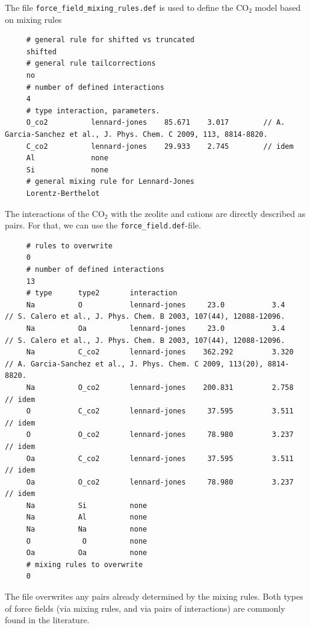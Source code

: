 \noindent 
The file \verb+force_field_mixing_rules.def+ is used to define the CO$_2$ model based on mixing rules
\begin{tiny}
\begin{verbatim}
     # general rule for shifted vs truncated
     shifted
     # general rule tailcorrections
     no
     # number of defined interactions
     4
     # type interaction, parameters.
     O_co2          lennard-jones    85.671    3.017        // A. Garcia-Sanchez et al., J. Phys. Chem. C 2009, 113, 8814-8820.
     C_co2          lennard-jones    29.933    2.745        // idem
     Al             none
     Si             none
     # general mixing rule for Lennard-Jones
     Lorentz-Berthelot
\end{verbatim}
\end{tiny}
The interactions of the CO$_2$ with the zeolite and cations are directly described as pairs.
For that, we can use the \verb+force_field.def+-file.
\begin{tiny}
\begin{verbatim}
     # rules to overwrite
     0
     # number of defined interactions
     13
     # type      type2       interaction
     Na          O           lennard-jones     23.0           3.4        // S. Calero et al., J. Phys. Chem. B 2003, 107(44), 12088-12096.
     Na          Oa          lennard-jones     23.0           3.4        // S. Calero et al., J. Phys. Chem. B 2003, 107(44), 12088-12096.
     Na          C_co2       lennard-jones    362.292         3.320      // A. Garcia-Sanchez et al., J. Phys. Chem. C 2009, 113(20), 8814-8820.
     Na          O_co2       lennard-jones    200.831         2.758      // idem
     O           C_co2       lennard-jones     37.595         3.511      // idem
     O           O_co2       lennard-jones     78.980         3.237      // idem
     Oa          C_co2       lennard-jones     37.595         3.511      // idem
     Oa          O_co2       lennard-jones     78.980         3.237      // idem
     Na          Si          none
     Na          Al          none
     Na          Na          none
     O            O          none
     Oa          Oa          none
     # mixing rules to overwrite
     0
\end{verbatim}
\end{tiny}
The file overwrites any pairs already determined by the mixing rules. Both types of force fields (via mixing rules, and via pairs of interactions)
are commonly found in the literature.

